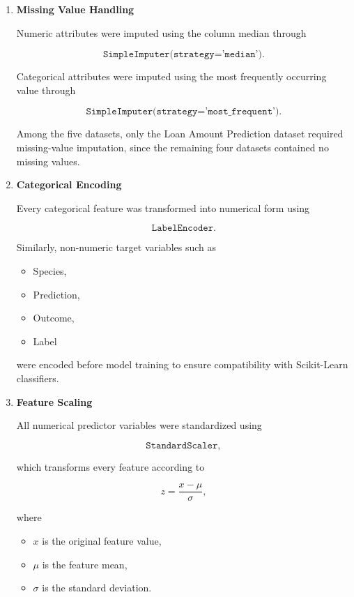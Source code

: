 \documentclass[12pt,a4paper]{article}
\begin{document}
\begin{enumerate}

\item \textbf{Missing Value Handling}

Numeric attributes were imputed using the column median through

\[
\texttt{SimpleImputer(strategy='median')}.
\]

Categorical attributes were imputed using the most frequently occurring
value through

\[
\texttt{SimpleImputer(strategy='most\_frequent')}.
\]

Among the five datasets, only the Loan Amount Prediction dataset required
missing-value imputation, since the remaining four datasets contained no
missing values.

\vspace{0.3cm}

\item \textbf{Categorical Encoding}

Every categorical feature was transformed into numerical form using

\[
\texttt{LabelEncoder}.
\]

Similarly, non-numeric target variables such as

\begin{itemize}
    \item Species,
    \item Prediction,
    \item Outcome,
    \item Label
\end{itemize}

were encoded before model training to ensure compatibility with
Scikit-Learn classifiers.

\vspace{0.3cm}

\item \textbf{Feature Scaling}

All numerical predictor variables were standardized using

\[
\texttt{StandardScaler},
\]

which transforms every feature according to

\[
z=\frac{x-\mu}{\sigma},
\]

where

\begin{itemize}
    \item $x$ is the original feature value,
    \item $\mu$ is the feature mean,
    \item $\sigma$ is the standard deviation.
\end{itemize}


\end{enumerate}
\end{document}
